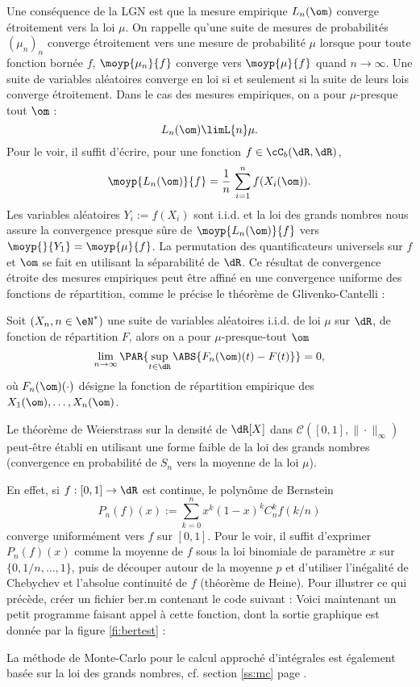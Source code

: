 Une conséquence de la LGN est que la mesure empirique $L_n(\om)$ converge
étroitement vers la loi $\mu$. On rappelle qu'une suite de mesures de
probabilités $(\mu_n)_n$ converge étroitement vers une mesure de probabilité
$\mu$ lorsque pour toute fonction bornée $f$, $\moyp{\mu_n}{f}$ converge vers
$\moyp{\mu}{f}$ quand $n\to\infty$.  Une suite de variables aléatoires converge
en loi si et seulement si la suite de leurs lois converge étroitement. Dans le
cas des mesures empiriques, on a pour $\mu$-presque tout $\om$ :
$$
L_n(\om)\limL{n}\mu.
$$
Pour le voir, il suffit d'écrire, pour une fonction $f\in\cC_b(\dR,\dR)$,
$$
\moyp{L_n(\om)}{f}=\frac{1}{n}\,\sum_{i=1}^n f(X_i(\om)).
$$
Les variables aléatoires $Y_i:=f(X_i)$ sont i.i.d. et la loi des grands
nombres nous assure la convergence presque sûre de $\moyp{L_n(\om)}{f}$ vers
$\moyp{}{Y_1}=\moyp{\mu}{f}$. La permutation des quantificateurs universels sur
$f$ et $\om$ se fait en utilisant la séparabilité de $\dR$. Ce résultat de
convergence étroite des mesures empiriques peut être affiné en une convergence
uniforme des fonctions de répartition, comme le précise le théorème de
Glivenko-Cantelli :

\begin{thm}\label{th:gc}
  Soit $(X_n,n\in\eN^*)$ une suite de variables aléatoires i.i.d. de loi $\mu$
  sur $\dR$, de fonction de répartition $F$, alors on a pour
  $\mu$-presque-tout $\om$
 \begin{equation}\label{eq:gc} 
 \lim_{n\to\infty} \PAR{\sup_{t \in \dR} \ABS{F_n(\om)(t)-F(t)}} = 0, 
\end{equation}
où $F_n(\om)(\cdot)$ désigne la fonction de répartition empirique des
$X_1(\om),\ldots,X_n(\om)$.
\end{thm}

\begin{exo}
  
  Le théorème de Weierstrass sur la densité de $\dR[X]$ dans
  $\mathcal{C}([0,1],\|\cdot\|_\infty)$ peut-être établi en utilisant une
  forme faible de la loi des grands nombres (convergence en probabilité de
  $S_n$ vers la moyenne de la loi $\mu$).
  
  En effet, si $f:[0,1]\to \dR$ est continue, le polynôme de Bernstein
  $$
  P_n(f)(x):=\sum_{k=0}^n x^k(1-x)^kC_n^k f(k/n)
  $$
  converge uniformément vers $f$ sur $[0,1]$. Pour le voir, il suffit
  d'exprimer $P_n(f)(x)$ comme la moyenne de $f$ sous la loi binomiale de
  paramètre $x$ sur $\{0,1/n,\ldots,1\}$, puis de découper autour de la
  moyenne $p$ et d'utiliser l'inégalité de Chebychev et l'absolue continuité
  de $f$ (théorème de Heine).  Pour illustrer ce qui précède, créer un fichier
  \textsf{ber.m} contenant le code suivant :
  Voici maintenant un petit programme faisant appel à cette fonction, dont la
  sortie graphique est donnée par la figure \ref{fi:bertest} :
\end{exo}
La méthode de Monte-Carlo pour le calcul approché d'intégrales est également
basée sur la loi des grands nombres, cf. section \ref{ss:mc} page
\pageref{ss:mc}.

